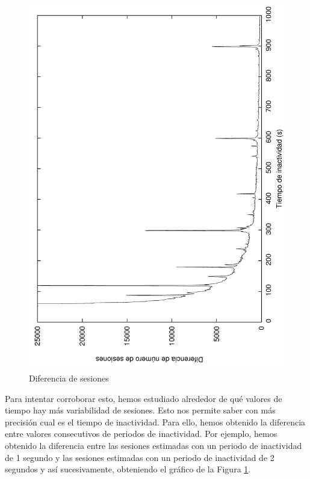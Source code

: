 \documentclass[twocolumn]{Jornadas}
\begin{document}
\begin{figure}[]
\begin{center}
  \includegraphics[scale=0.30,angle=-90]{figures/diffInactivitiPeriod_full.pdf}
\end{center}
\caption{Diferencia de sesiones} \label{fig:diffSessions}
\end{figure}

Para intentar corroborar esto, hemos estudiado alrededor de qué valores de tiempo hay más variabilidad de sesiones. Esto nos permite saber con más precisión cual es el tiempo de inactividad. Para ello, hemos obtenido la diferencia entre valores consecutivos de periodos de inactividad. Por ejemplo, hemos obtenido la diferencia entre las sesiones estimadas con un periodo de inactividad de 1 segundo y las sesiones estimadas con un periodo de inactividad de 2 segundos y así sucesivamente, obteniendo el gráfico de la Figura \ref{fig:diffSessions}.
\end{document}
